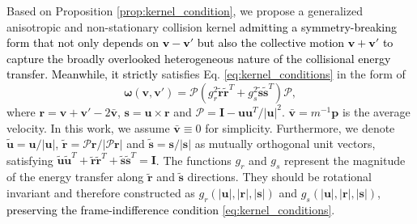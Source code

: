\documentclass[preprint,1p,times]{elsarticle}
\theoremstyle{definition}
\theoremstyle{remark}
\newcommand{\tcb}[1]{\textcolor{black}{#1}}
\begin{document}
Based on Proposition \ref{prop:kernel_condition}, we propose a generalized anisotropic and non-stationary collision kernel \tcb{admitting a symmetry-breaking form that not only depends on $\boldsymbol{v} - \boldsymbol{v}'$ but also the collective motion $\boldsymbol{v} + \boldsymbol{v}'$ to capture the broadly overlooked heterogeneous nature of the collisional energy transfer. Meanwhile, it strictly} satisfies Eq. \eqref{eq:kernel_conditions} in the form of 
\begin{equation}\label{eq:CM2}
    \boldsymbol{\omega} (\boldsymbol{v}, \boldsymbol{v}') = \boldsymbol{\mathcal{P}} \left(g_{r}^2 \widetilde{\boldsymbol{r}}\widetilde{\boldsymbol{r}}^T + g_{s}^2 \widetilde{\boldsymbol{s}}\widetilde{\boldsymbol{s}}^T\right) \boldsymbol{\mathcal{P}},
\end{equation}
where $\boldsymbol{r}=\boldsymbol{v}+\boldsymbol{v}' - 2\bar{\boldsymbol{v}}$, $\boldsymbol{s}=\boldsymbol{u}\times\boldsymbol{r}$ and $\boldsymbol{\mathcal{P}}=\boldsymbol{I}-\boldsymbol{u}\boldsymbol{u}^T/|\boldsymbol{u}|^2$. $\bar{\boldsymbol{v}} = m^{-1} \boldsymbol{p}$ is the average velocity. In this work, we assume $\bar{\boldsymbol{v}} \equiv 0$ for simplicity.  Furthermore, we denote $\widetilde{\boldsymbol{u}}=\boldsymbol{u}/|\boldsymbol{u}|$, $\widetilde{\boldsymbol{r}}=\boldsymbol{\mathcal{P}}\boldsymbol{r}/|\boldsymbol{\mathcal{P}}\boldsymbol{r}|$ and $\widetilde{\boldsymbol{s}}=\boldsymbol{s}/|\boldsymbol{s}|$ as mutually orthogonal unit vectors, satisfying $\widetilde{\boldsymbol{u}} \widetilde{\boldsymbol{u}}^{T} + \widetilde{\boldsymbol{r}} \widetilde{\boldsymbol{r}}^{T} + \widetilde{\boldsymbol{s}} \widetilde{\boldsymbol{s}}^{T} = \boldsymbol{I}$.  The functions $g_{r}$ and $g_{s}$ represent the magnitude of the energy transfer along $\widetilde{\boldsymbol{r}}$ and $\widetilde{\boldsymbol{s}}$ directions. They should be rotational invariant and therefore constructed as $g_r\left (\vert \boldsymbol{u}\vert, \vert \boldsymbol{r}\vert, \vert \boldsymbol{s}\vert \right)$ and $g_s\left (\vert \boldsymbol{u}\vert, \vert \boldsymbol{r}\vert, \vert \boldsymbol{s}\vert \right)$, \tcb{preserving the frame-indifference condition \eqref{eq:kernel_conditions}}.
\end{document}
